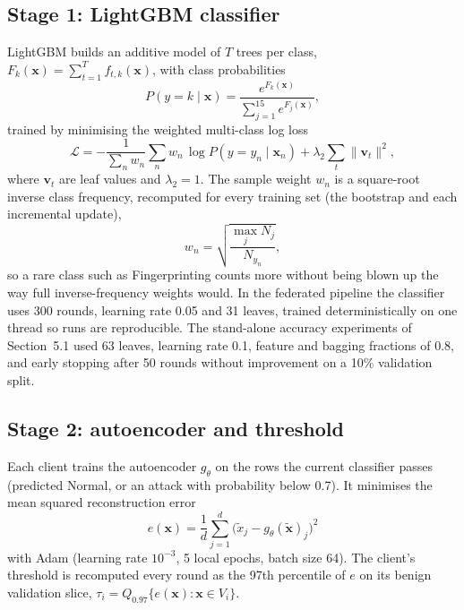 \subsection{Stage 1: LightGBM classifier}
LightGBM builds an additive model of $T$ trees per class, $F_k(\mathbf{x}) = \sum_{t=1}^{T} f_{t,k}(\mathbf{x})$, with class probabilities
\begin{equation}
  P(y=k\mid\mathbf{x}) = \frac{e^{F_k(\mathbf{x})}}{\sum_{j=1}^{15} e^{F_j(\mathbf{x})}},
\end{equation}
trained by minimising the weighted multi-class log loss
\begin{equation}
  \mathcal{L} = -\frac{1}{\sum_n w_n}\sum_{n} w_{n}\,\log P(y=y_n\mid\mathbf{x}_n) + \lambda_2 \sum_{t}\lVert \mathbf{v}_t\rVert^2 ,
\end{equation}
where $\mathbf{v}_t$ are leaf values and $\lambda_2 = 1$. The sample weight $w_n$ is a square-root inverse class frequency, recomputed for every training set (the bootstrap and each incremental update),
\begin{equation}
  w_n = \sqrt{\frac{\max_j N_j}{N_{y_n}}},
\end{equation}
so a rare class such as Fingerprinting counts more without being blown up the way full inverse-frequency weights would. In the federated pipeline the classifier uses 300 rounds, learning rate 0.05 and 31 leaves, trained deterministically on one thread so runs are reproducible. The stand-alone accuracy experiments of Section~5.1 used 63 leaves, learning rate 0.1, feature and bagging fractions of 0.8, and early stopping after 50 rounds without improvement on a 10\% validation split.

\subsection{Stage 2: autoencoder and threshold}
Each client trains the autoencoder $g_\theta$ on the rows the current classifier passes (predicted Normal, or an attack with probability below 0.7). It minimises the mean squared reconstruction error
\begin{equation}
  e(\mathbf{x}) = \frac{1}{d}\sum_{j=1}^{d}\big(\tilde{x}_j - g_\theta(\tilde{\mathbf{x}})_j\big)^2
\end{equation}
with Adam (learning rate $10^{-3}$, 5 local epochs, batch size 64). The client's threshold is recomputed every round as the 97th percentile of $e$ on its benign validation slice, $\tau_i = Q_{0.97}\{e(\mathbf{x}) : \mathbf{x}\in V_i\}$.

